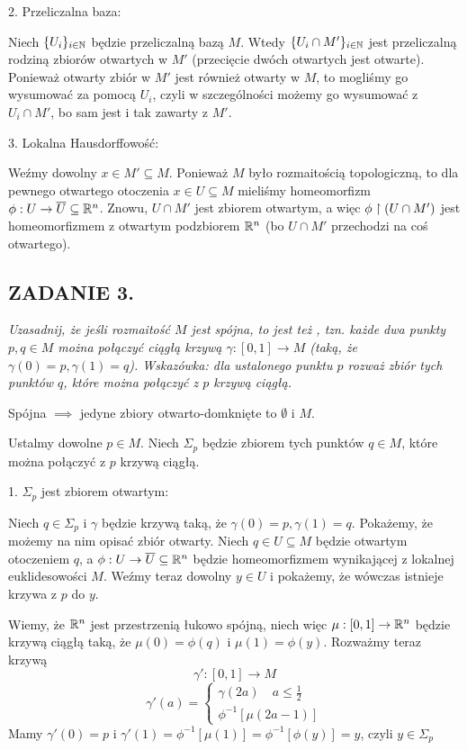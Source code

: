 \documentclass{article}
\begin{document}
2. Przeliczalna baza:

Niech $\{U_i\}_{i\in\mathbb{N}}$ będzie przeliczalną bazą $M$. Wtedy $\{U_i\cap M'\}_{i\in\mathbb{N}}$ jest przeliczalną rodziną zbiorów otwartych w $M'$ (przecięcie dwóch otwartych jest otwarte). Ponieważ otwarty zbiór w $M'$ jest również otwarty w $M$, to mogliśmy go wysumować za pomocą $U_i$, czyli w szczególności możemy go wysumować z $U_i\cap M'$, bo sam jest i tak zawarty z $M'$.

3. Lokalna Hausdorffowość:

Weźmy dowolny $x\in M'\subseteq M$. Ponieważ $M$ było rozmaitością topologiczną, to dla pewnego otwartego otoczenia $x\in U\subseteq M$ mieliśmy homeomorfizm $\phi:U\to\overline U\subseteq\mathbb{R}^n$. Znowu, $U\cap M'$ jest zbiorem otwartym, a więc $\phi\upharpoonright (U\cap M')$ jest homeomorfizmem z otwartym podzbiorem $\mathbb{R}^n$ (bo $U\cap M'$ przechodzi na coś otwartego).

\subsection*{ZADANIE 3.}
\emph{\color{pink}Uzasadnij, że jeśli rozmaitość $M$ jest spójna, to jest też , tzn. każde dwa punkty $p,q\in M$ można połączyć ciągłą krzywą $\gamma:[0,1]\to M$ (taką, że $\gamma(0)=p,\gamma(1)=q$). Wskazówka: dla ustalonego punktu $p$ rozważ zbiór tych punktów $q$, które można połączyć z $p$ krzywą ciągłą.}
\medskip

Spójna $\implies$ jedyne zbiory otwarto-domknięte to $\emptyset$ i $M$.

Ustalmy dowolne $p\in M$. Niech $\Sigma_p$ będzie zbiorem tych punktów $q\in M$, które można połączyć z $p$ krzywą ciągłą. 


1. $\Sigma_p$ jest zbiorem otwartym:

Niech $q\in\Sigma_p$ i $\gamma$ będzie krzywą taką, że $\gamma(0)=p,\gamma(1)=q$. Pokażemy, że możemy na nim opisać zbiór otwarty. Niech $q\in U\subseteq M$ będzie otwartym otoczeniem $q$, a $\phi:U\to\overline U\subseteq \mathbb{R}^n$ będzie homeomorfizmem wynikającej z lokalnej euklidesowości $M$. Weźmy teraz dowolny $y\in U$ i pokażemy, że wówczas istnieje krzywa z $p$ do $y$.

Wiemy, że $\mathbb{R}^n$ jest przestrzenią łukowo spójną, niech więc $\mu:[0,1]\to\mathbb{R}^n$ będzie krzywą ciągłą taką, że $\mu(0)=\phi(q)$ i $\mu(1)=\phi(y)$. Rozważmy teraz krzywą
$$\gamma':[0,1]\to M$$
$$\gamma'(a)=\begin{cases}
    \gamma(2a)\quad a\leq\frac12\\
    \phi^{-1}[\mu(2a-1)]
\end{cases}$$
Mamy $\gamma'(0)=p$ i $\gamma'(1)=\phi^{-1}[\mu(1)]=\phi^{-1}[\phi(y)]=y$, czyli $y\in \Sigma_p$
\end{document}
